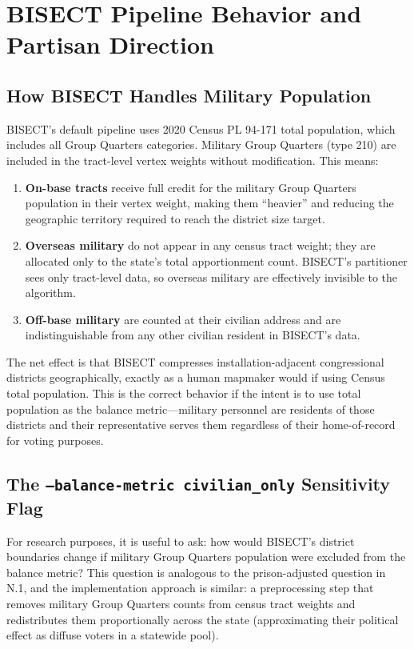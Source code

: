 \section{BISECT Pipeline Behavior and Partisan Direction}
\label{sec:bisect-partisan}

\subsection{How BISECT Handles Military Population}

BISECT's default pipeline uses 2020 Census PL 94-171 total population, which includes all Group Quarters categories. Military Group Quarters (type 210) are included in the tract-level vertex weights without modification. This means:

\begin{enumerate}
    \item \textbf{On-base tracts} receive full credit for the military Group Quarters population in their vertex weight, making them ``heavier'' and reducing the geographic territory required to reach the district size target.
    \item \textbf{Overseas military} do not appear in any census tract weight; they are allocated only to the state's total apportionment count. BISECT's partitioner sees only tract-level data, so overseas military are effectively invisible to the algorithm.
    \item \textbf{Off-base military} are counted at their civilian address and are indistinguishable from any other civilian resident in BISECT's data.
\end{enumerate}

The net effect is that BISECT compresses installation-adjacent congressional districts geographically, exactly as a human mapmaker would if using Census total population. This is the correct behavior if the intent is to use total population as the balance metric---military personnel are residents of those districts and their representative serves them regardless of their home-of-record for voting purposes.

\subsection{The \texttt{--balance-metric civilian\_only} Sensitivity Flag}

For research purposes, it is useful to ask: how would BISECT's district boundaries change if military Group Quarters population were excluded from the balance metric? This question is analogous to the prison-adjusted question in N.1, and the implementation approach is similar: a preprocessing step that removes military Group Quarters counts from census tract weights and redistributes them proportionally across the state (approximating their political effect as diffuse voters in a statewide pool).


